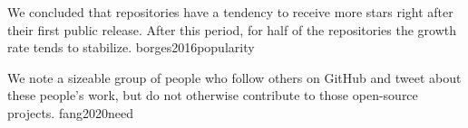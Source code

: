 \documentclass{article}
\begin{document}


%

  {We concluded that repositories have a tendency to receive more stars right after their first public release. After this period, for half of the repositories the growth rate tends to stabilize.}
  {borges2016popularity}

  {We note a sizeable group of people who follow others on GitHub and tweet about these people’s work, but do not otherwise contribute to those open-source projects.}
  {fang2020need}
\end{document}
